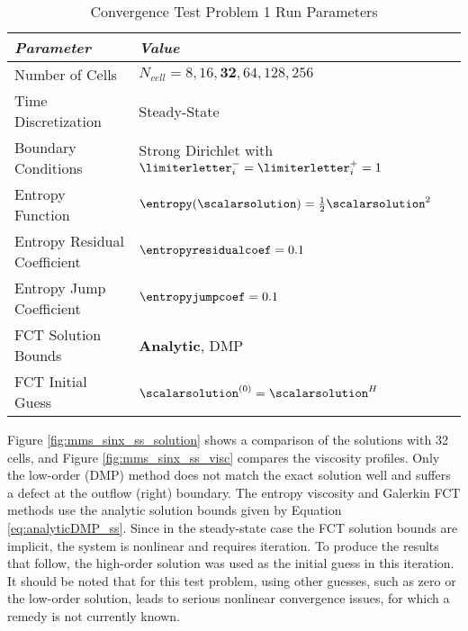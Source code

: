 \begin{table}[htb]
\caption{Convergence Test Problem 1 Run Parameters}
\label{tab:mms_sinx_ss_run_parameters}
\centering
\begin{tabular}{l l}\toprule
\emph{Parameter} & \emph{Value}\\\midrule
Number of Cells & $N_{cell} = 8,16,\mathbf{32},64,128,256$\\
Time Discretization & Steady-State\\
Boundary Conditions & Strong Dirichlet with
  $\limiterletter_i^-=\limiterletter_i^+=1$\\\midrule
Entropy Function & $\entropy(\scalarsolution) = \frac{1}{2}\scalarsolution^2$\\
Entropy Residual Coefficient & $\entropyresidualcoef = 0.1$\\
Entropy Jump Coefficient & $\entropyjumpcoef = 0.1$\\\midrule
FCT Solution Bounds & \textbf{Analytic}, DMP\\
FCT Initial Guess & $\scalarsolution^{(0)} = \scalarsolution^H$\\
\bottomrule\end{tabular}
\end{table}

Figure \ref{fig:mms_sinx_ss_solution} shows a comparison of the solutions with
32 cells, and Figure \ref{fig:mms_sinx_ss_visc} compares the viscosity
profiles. Only the low-order (DMP) method does not match the exact solution
well and suffers a defect at the outflow (right) boundary.
The entropy viscosity and Galerkin FCT methods use the analytic solution bounds
given by Equation \eqref{eq:analyticDMP_ss}.
Since in the steady-state
case the FCT solution bounds are implicit, the system is nonlinear and requires
iteration. To produce the results that follow, the high-order solution was
used as the initial guess in this iteration. It should be noted that for this
test problem, using other guesses, such as zero or the low-order solution,
leads to serious nonlinear convergence issues, for which a remedy is not
currently known.

